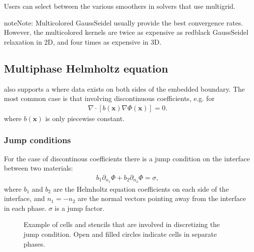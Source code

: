 \documentclass[letterpaper,10pt,english]{sphinxmanual}
\let\sphinxpxdimen\pdfpxdimen\else\newdimen\sphinxpxdimen
\begin{document}
\sphinxAtStartPar
Users can select between the various smoothers in solvers that use multigrid.

\begin{sphinxadmonition}{note}{Note:}
\sphinxAtStartPar
Multi\sphinxhyphen{}colored Gauss\sphinxhyphen{}Seidel usually provide the best convergence rates.
However, the multi\sphinxhyphen{}colored kernels are twice as expensive as red\sphinxhyphen{}black Gauss\sphinxhyphen{}Seidel relaxation in 2D, and four times as expensive in 3D.
\end{sphinxadmonition}


\subsection{Multiphase Helmholtz equation}
\label{\detokenize{Source/LinearSolvers:multiphase-helmholtz-equation}}
\sphinxAtStartPar
{} also supports a  where data exists on both sides of the embedded boundary.
The most common case is that involving discontinuous coefficients, e.g. for
\begin{equation*}
\begin{split}\nabla\cdot\left[b\left(\mathbf{x}\right)\nabla\Phi\left(\mathbf{x}\right)\right] = 0.\end{split}
\end{equation*}
\sphinxAtStartPar
where \(b\left(\mathbf{x}\right)\) is only piecewise constant.


\subsubsection{Jump conditions}
\label{\detokenize{Source/LinearSolvers:jump-conditions}}
\sphinxAtStartPar
For the case of discontinous coefficients there is a jump condition on the interface between two materials:
\begin{equation*}
\begin{split}b_1\partial_{n_1}\Phi + b_2\partial_{n_2}\Phi = \sigma,\end{split}
\end{equation*}
\sphinxAtStartPar
where \(b_1\) and \(b_2\) are the Helmholtz equation coefficients on each side of the interface, and \(n_1 = -n_2\) are the normal vectors pointing away from the interface in each phase.
\(\sigma\) is a jump factor.

\begin{figure}[htb]
\centering
\capstart

\noindent\sphinxincludegraphics[width=360\sphinxpxdimen]{{JumpCondition}.png}
\caption{Example of cells and stencils that are involved in discretizing the jump condition. Open and filled circles indicate cells in separate phases.}\label{\detokenize{Source/LinearSolvers:id6}}\label{\detokenize{Source/LinearSolvers:fig-jumpcondition}}\end{figure}
\end{document}

